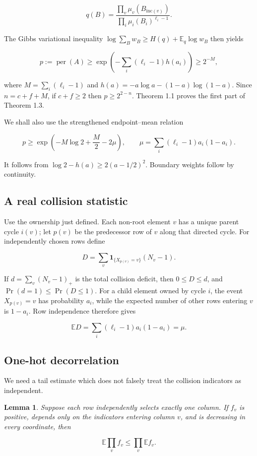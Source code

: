 \documentclass[11pt]{article}
\newtheorem{lemma}[theorem]{Lemma}
\begin{document}
\[
q(B)=\frac{\prod_v\mu_v(B_{\mathrm{inc}(v)})}
{\prod_i\mu_i(B_i)^{\ell_i-1}}. \tag{5.1}
\]

The Gibbs variational inequality
$\log\sum_Bw_B\ge H(q)+\mathbb E_q\log w_B$
then yields

\[
p:=\operatorname{per}(A)
\ge\exp\!\left(-\sum_i(\ell_i-1)h(a_i)\right)
\ge2^{-M}, \tag{5.2}
\]

where $M=\sum_i(\ell_i-1)$ and
$h(a)=-a\log a-(1-a)\log(1-a)$.  Since $n=c+f+M$, if $c+f\ge2$ then
$p\ge2^{2-n}$.  Theorem 1.1 proves the first part of Theorem 1.3.

We shall also use the strengthened endpoint--mean relation

\[
p\ge\exp\left(-M\log2+\frac M2-2\mu\right),
\qquad
\mu=\sum_i(\ell_i-1)a_i(1-a_i). \tag{5.3}
\]

It follows from $\log2-h(a)\ge2(a-1/2)^2$.  Boundary weights follow by
continuity.

\subsection{A real collision statistic}


Use the ownership just defined.  Each non-root element $v$ has a unique parent
cycle $i(v)$; let $p(v)$ be the predecessor row of $v$ along that
directed cycle.  For independently chosen rows define

\[
D=\sum_v\mathbf1_{\{X_{p(v)}=v\}}(N_v-1). \tag{5.4}
\]

If $d=\sum_v(N_v-1)_+$ is the total collision deficit, then
$0\le D\le d$, and $\Pr(d=1)\le\Pr(D\le1)$.  For a child
element owned by cycle $i$, the event
$X_{p(v)}=v$ has probability $a_i$, while the expected number of other
rows entering $v$ is $1-a_i$.  Row independence therefore gives

\[
\mathbb ED=\sum_i(\ell_i-1)a_i(1-a_i)=\mu. \tag{5.5}
\]

\subsection{One-hot decorrelation}


We need a tail estimate which does not falsely treat the collision indicators as
independent.

\Needspace{0.18\textheight}
\begin{lemma}

Suppose each row independently selects exactly one column.  If $f_v$ is positive,
depends only on the indicators entering column $v$, and is decreasing in every
coordinate, then

\[
\mathbb E\prod_vf_v\le\prod_v\mathbb Ef_v. \tag{5.6}
\]

\end{lemma}
\end{document}
